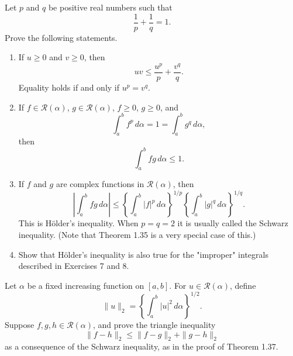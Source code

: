   \begin{exercise}[Rudin 6.10]
    Let $p$ and $q$ be positive real numbers such that
    \begin{equation}
      \frac{1}{p} + \frac{1}{q} = 1.
    \end{equation}
    Prove the following statements.
    \begin{enumerate}
      \item[(a)] If $u \ge 0$ and $v \ge 0$, then
      \begin{equation}
        uv \le \frac{u^p}{p} + \frac{v^q}{q}.
      \end{equation}
      Equality holds if and only if $u^p = v^q$.
      \item[(b)] If $f \in \mathscr{R}(\alpha)$, $g \in \mathscr{R}(\alpha)$, $f \ge 0$, $g \ge 0$, and
      \begin{equation}
        \int_a^b f^p \, d\alpha = 1 = \int_a^b g^q \, d\alpha,
      \end{equation}
      then
      \begin{equation}
        \int_a^b fg \, d\alpha \le 1.
      \end{equation}
      \item[(c)] If $f$ and $g$ are complex functions in $\mathscr{R}(\alpha)$, then
      \begin{equation}
        \left| \int_a^b fg \, d\alpha \right| \le \left\{ \int_a^b |f|^p \, d\alpha \right\}^{1/p} \left\{ \int_a^b |g|^q \, d\alpha \right\}^{1/q}.
      \end{equation}
      This is H\"{o}lder's inequality. When $p = q = 2$ it is usually called the Schwarz inequality. (Note that Theorem 1.35 is a very special case of this.)
      \item[(d)] Show that H\"{o}lder's inequality is also true for the "improper" integrals described in Exercises 7 and 8.
    \end{enumerate}
  \end{exercise}
  \begin{solution}

  \end{solution}

  \begin{exercise}[Rudin 6.11]
    Let $\alpha$ be a fixed increasing function on $[a, b]$. For $u \in \mathscr{R}(\alpha)$, define
    \begin{equation}
      \|u\|_2 = \left\{ \int_a^b |u|^2 \, d\alpha \right\}^{1/2}.
    \end{equation}
    Suppose $f, g, h \in \mathscr{R}(\alpha)$, and prove the triangle inequality
    \begin{equation}
      \|f - h\|_2 \le \|f - g\|_2 + \|g - h\|_2
    \end{equation}
    as a consequence of the Schwarz inequality, as in the proof of Theorem 1.37.
  \end{exercise}
  \begin{solution}

  \end{solution}

